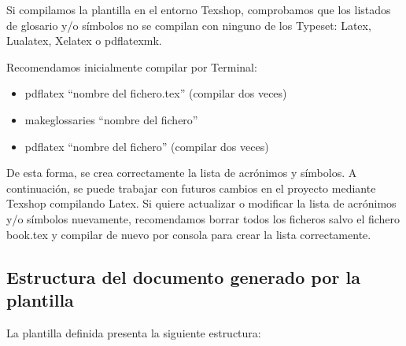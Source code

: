 \documentclass[spanish,openright]{book}
\begin{document}
Si compilamos la plantilla en el entorno Texshop, comprobamos que los
listados de glosario y/o símbolos no se compilan con ninguno de los
Typeset: Latex, Lualatex, Xelatex o pdflatexmk.

Recomendamos inicialmente compilar por Terminal:

\begin{itemize}
\item pdflatex “nombre del fichero.tex” (compilar dos veces)
\item makeglossaries “nombre del fichero”
\item pdflatex “nombre del fichero” (compilar dos veces)
\end{itemize}

De esta forma, se crea correctamente la lista de acrónimos y símbolos. A
continuación, se puede trabajar con futuros cambios en el proyecto
mediante Texshop compilando Latex. Si quiere actualizar o modificar la
lista de acrónimos y/o símbolos nuevamente, recomendamos borrar todos
los ficheros salvo el fichero book.tex y compilar de nuevo por consola
para crear la lista correctamente.



\subsection{Estructura del documento generado por la plantilla}
\label{sec:estr-del-docum}

La plantilla definida presenta la siguiente estructura:
\end{document}
